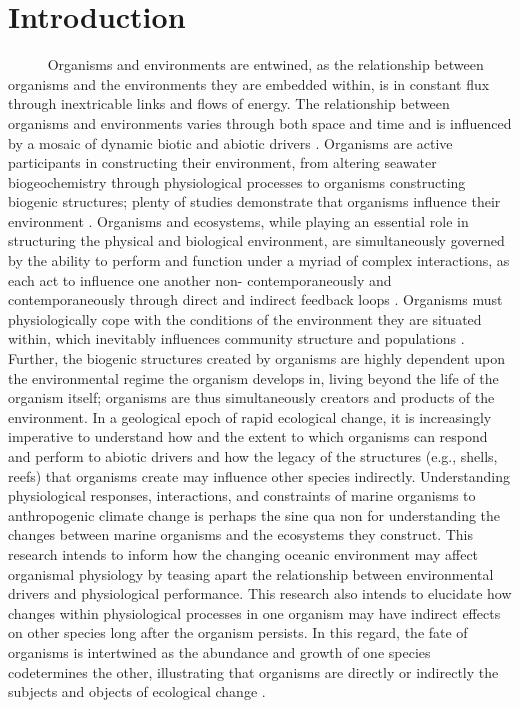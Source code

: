 \documentclass[
]{article}
\author{}
\date{\vspace{-2.5em}}
\begin{document}
\hypertarget{introduction}{%
\section{Introduction}\label{introduction}}

~~~~~ Organisms and environments are entwined, as the relationship
between organisms and the environments they are embedded within, is in
constant flux through inextricable links and flows of energy. The
relationship between organisms and environments varies through both
space and time and is influenced by a mosaic of dynamic biotic and
abiotic drivers \citep{connell1977mechanisms, menge1987community}.
Organisms are active participants in constructing their environment,
from altering seawater biogeochemistry through physiological processes
to organisms constructing biogenic structures; plenty of studies
demonstrate that organisms influence their environment
\citep{lewontin1983organism,estes1974sea}. Organisms and ecosystems,
while playing an essential role in structuring the physical and
biological environment, are simultaneously governed by the ability to
perform and function under a myriad of complex interactions, as each act
to influence one another non- contemporaneously and contemporaneously
through direct and indirect feedback loops
\citep{levin1974disturbance,paine1980food}. Organisms must
physiologically cope with the conditions of the environment they are
situated within, which inevitably influences community structure and
populations \citep{bozinovic2015physiological}. Further, the biogenic
structures created by organisms are highly dependent upon the
environmental regime the organism develops in, living beyond the life of
the organism itself; organisms are thus simultaneously creators and
products of the environment. In a geological epoch of rapid ecological
change, it is increasingly imperative to understand how and the extent
to which organisms can respond and perform to abiotic drivers and how
the legacy of the structures (e.g., shells, reefs) that organisms create
may influence other species indirectly. Understanding physiological
responses, interactions, and constraints of marine organisms to
anthropogenic climate change is perhaps the sine qua non for
understanding the changes between marine organisms and the ecosystems
they construct. This research intends to inform how the changing oceanic
environment may affect organismal physiology by teasing apart the
relationship between environmental drivers and physiological
performance. This research also intends to elucidate how changes within
physiological processes in one organism may have indirect effects on
other species long after the organism persists. In this regard, the fate
of organisms is intertwined as the abundance and growth of one species
codetermines the other, illustrating that organisms are directly or
indirectly the subjects and objects of ecological change
\citep{lewontin1983organism}.
\end{document}
